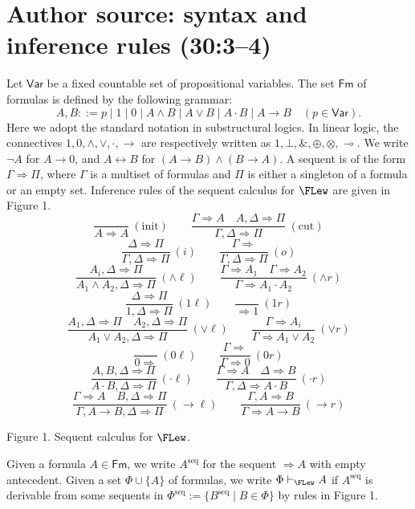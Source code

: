 \section*{Author source: syntax and inference rules (30:3--4)}
Let $\mathsf{Var}$ be a fixed countable set of propositional variables. The set $\mathsf{Fm}$ of formulas is defined by the following grammar:
\[
 A,B::=p\mid1\mid0\mid A\wedge B\mid A\vee B\mid A\cdot B\mid A\to B\quad(p\in\mathsf{Var}).
\]
Here we adopt the standard notation in substructural logics. In linear logic, the connectives $1,0,\wedge,\vee,\cdot,\to$ are respectively written as $1,\bot,\&,\oplus,\otimes,\multimap$. We write $\neg A$ for $A\to0$, and $A\leftrightarrow B$ for $(A\to B)\wedge(B\to A)$.
A sequent is of the form $\Gamma\Rightarrow\Pi$, where $\Gamma$ is a multiset of formulas and $\Pi$ is either a singleton of a formula or an empty set. Inference rules of the sequent calculus for $\FLew$ are given in Figure 1.
\[
 \frac{}{A\Rightarrow A}\ (\mathrm{init})\qquad
 \frac{\Gamma\Rightarrow A\quad A,\Delta\Rightarrow\Pi}{\Gamma,\Delta\Rightarrow\Pi}\ (\mathrm{cut})
\]
\[
 \frac{\Delta\Rightarrow\Pi}{\Gamma,\Delta\Rightarrow\Pi}\ (i)\qquad
 \frac{\Gamma\Rightarrow}{\Gamma,\Delta\Rightarrow\Pi}\ (o)
\]
\[
 \frac{A_i,\Delta\Rightarrow\Pi}{A_1\wedge A_2,\Delta\Rightarrow\Pi}\ (\wedge\ell)\qquad
 \frac{\Gamma\Rightarrow A_1\quad\Gamma\Rightarrow A_2}{\Gamma\Rightarrow A_1\cdot A_2}\ (\wedge r)
\]
\[
 \frac{\Delta\Rightarrow\Pi}{1,\Delta\Rightarrow\Pi}\ (1\ell)\qquad \frac{}{\Rightarrow1}\ (1r)
\]
\[
 \frac{A_1,\Delta\Rightarrow\Pi\quad A_2,\Delta\Rightarrow\Pi}{A_1\vee A_2,\Delta\Rightarrow\Pi}\ (\vee\ell)\qquad
 \frac{\Gamma\Rightarrow A_i}{\Gamma\Rightarrow A_1\vee A_2}\ (\vee r)
\]
\[
 \frac{}{0\Rightarrow}\ (0\ell)\qquad \frac{\Gamma\Rightarrow}{\Gamma\Rightarrow0}\ (0r)
\]
\[
 \frac{A,B,\Delta\Rightarrow\Pi}{A\cdot B,\Delta\Rightarrow\Pi}\ (\cdot\ell)\qquad
 \frac{\Gamma\Rightarrow A\quad\Delta\Rightarrow B}{\Gamma,\Delta\Rightarrow A\cdot B}\ (\cdot r)
\]
\[
 \frac{\Gamma\Rightarrow A\quad B,\Delta\Rightarrow\Pi}{\Gamma,A\to B,\Delta\Rightarrow\Pi}\ (\to\ell)\qquad
 \frac{\Gamma,A\Rightarrow B}{\Gamma\Rightarrow A\to B}\ (\to r)
\]
\begin{center}Figure 1. Sequent calculus for $\FLew$.\end{center}
Given a formula $A\in\mathsf{Fm}$, we write $A^{\mathrm{seq}}$ for the sequent $\Rightarrow A$ with empty antecedent.
Given a set $\Phi\cup\{A\}$ of formulas, we write $\Phi\vdash_{\FLew} A$ if $A^{\mathrm{seq}}$ is derivable from some sequents in $\Phi^{\mathrm{seq}}:=\{B^{\mathrm{seq}}\mid B\in\Phi\}$ by rules in Figure 1.
